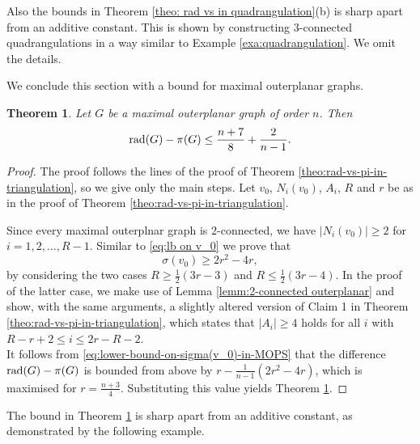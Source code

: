 \documentclass[a4paper,11pt]{article}
\newtheorem{theorem}{Theorem}[section]
\begin{document}
Also the bounds in Theorem \ref{theo: rad vs in quadrangulation}(b) 
is sharp apart from an additive constant. This is shown by constructing $3$-connected
quadrangulations in a way similar to 
Example \ref{exa:quadrangulation}. We omit the details.  

We conclude this section with a bound for maximal outerplanar graphs. 

\begin{theorem} \label{theo:rad-vs-pi-in-MOPS}
Let $G$ be a maximal outerplanar graph of order $n$. Then
  \[
{\rm rad}(G) - \pi(G) \leq \frac{n+7}{8}+\frac{2}{n-1}.
\]

\end{theorem}
  
\begin{proof}
The proof follows the lines of the proof of Theorem \ref{theo:rad-vs-pi-in-triangulation}, 
so we give only the main steps. 
Let $v_0$, $N_i(v_0)$, $A_i$, $R$ and $r$ 
be as in the proof of Theorem \ref{theo:rad-vs-pi-in-triangulation}. 

Since every maximal outerplnar graph is $2$-connected, we have $|N_i(v_0)| \geq 2$ for 
$i=1,2,\ldots,R-1$. 
Similar to \eqref{eq:lb on v_0} we prove that 
\begin{equation}  \label{eq:lower-bound-on-sigma(v_0)-in-MOPS} 
\sigma(v_0) \geq 2r^2 - 4r, 
\end{equation}
by considering the two cases $R \geq \frac{1}{2}(3r-3)$ and $R \leq \frac{1}{2}(3r-4)$. 
In the proof of the latter case, we make use of Lemma \ref{lemm:2-connected outerplanar} 
and show, with the same arguments, a slightly altered version of Claim 1 in 
Theorem \ref{theo:rad-vs-pi-in-triangulation}, which states that $|A_i| \geq 4$ holds
for all $i$ with $R-r+2 \leq i \leq 2r-R-2$. \\
It follows from  \eqref{eq:lower-bound-on-sigma(v_0)-in-MOPS} that
the difference ${\rm rad}(G) - \pi(G)$ is bounded from above by $r - \frac{1}{n-1}(2r^2 - 4r)$,
which is maximised for $r=\frac{n+3}{4}$. Substituting this value yields 
Theorem \ref{theo:rad-vs-pi-in-MOPS}. 
\end{proof}  
  



The bound in Theorem \ref{theo:rad-vs-pi-in-MOPS} is sharp apart from an additive constant,
as demonstrated by the following example. 
   
\end{document}
